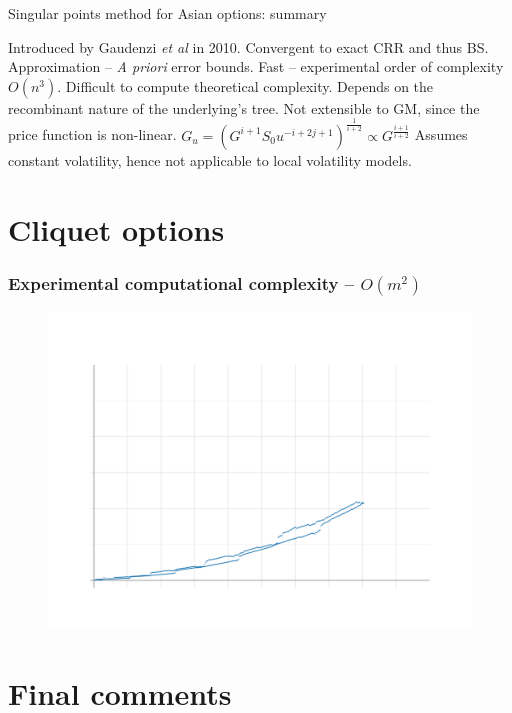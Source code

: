\documentclass[utf8,t,xcolor=svgnames]{beamer}
\begin{document}
\begin{frame}{Singular points method for Asian options: summary}
	\begin{itemize}
		\neu Introduced by Gaudenzi \emph{et al} \cite{Gaudenzi2010} in 2010.
		\pro Convergent to exact CRR and thus BS.
		\pro Approximation -- \emph{A priori} error bounds.
		\pro Fast -- experimental order of complexity $ O(n^3) $.
		\con Difficult to compute theoretical complexity.
		\con Depends on the recombinant nature of the underlying's tree.
		\con<alert@1-> Not extensible to GM, since the price function is non-linear. $ G_u = \left( G^{i+1} S_0 u^{-i+2j+1} \right)^{\frac{1}{i+2}} \propto G^{\frac{i+1}{i+2}} $
		\con<alert@1-> Assumes constant volatility, hence not applicable to local volatility models.
	\end{itemize}
\end{frame}



\section{Cliquet options}

\begin{frame}
	\frametitle{Experimental computational complexity -- $ O(m^2) $}
	
	\begin{figure}
		\centering
		\includegraphics[width=0.85\linewidth]{../img/timing-cliquet}
	\end{figure}
\end{frame}



\section{Final comments}
\end{document}
